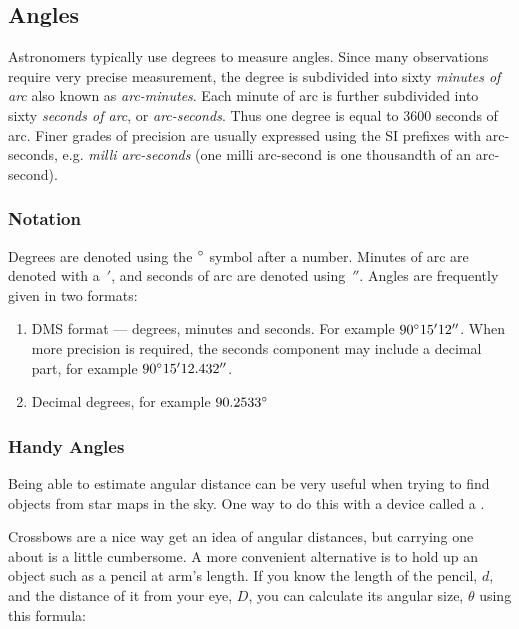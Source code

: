 \subsection{Angles}
\label{sec:Concepts:Angles}

Astronomers typically use degrees to measure angles. Since many
observations require very precise measurement, the degree is subdivided
into sixty \emph{minutes of arc} also known as \emph{arc-minutes}. Each
minute of arc is further subdivided into sixty \emph{seconds of arc}, or
\emph{arc-seconds}. Thus one degree is equal to 3600 seconds of arc.
Finer grades of precision are usually expressed using the SI prefixes
with arc-seconds, e.g. \emph{milli arc-seconds} (one milli arc-second is
one thousandth of an arc-second).

\subsubsection{Notation}

Degrees are denoted using the $\degree$ symbol after a number. Minutes of arc are denoted with a~$'$, and seconds of arc are denoted using~$''$. Angles are frequently given in two formats:

\begin{enumerate}
\item
  DMS format --- degrees, minutes and seconds. For example $90\degree15'12''$.
  When more precision is required, the seconds component may include a
  decimal part, for example $90\degree15'12.432''$.
\item
  Decimal degrees, for example $90.2533\degree$
\end{enumerate}

\subsubsection{Handy Angles}
\label{sec:Concepts:Angles:HandyAngles}

Being able to estimate angular distance can be very useful when trying
to find objects from star maps in the sky. One way to do this with a
device called a .


Crossbows are a nice way get an idea of angular distances, but carrying
one about is a little cumbersome. A more convenient alternative is to
hold up an object such as a pencil at arm's length. If you know the
length of the pencil, $d$, and the distance of it from your eye, $D$, you
can calculate its angular size, $\theta$ using this formula:

